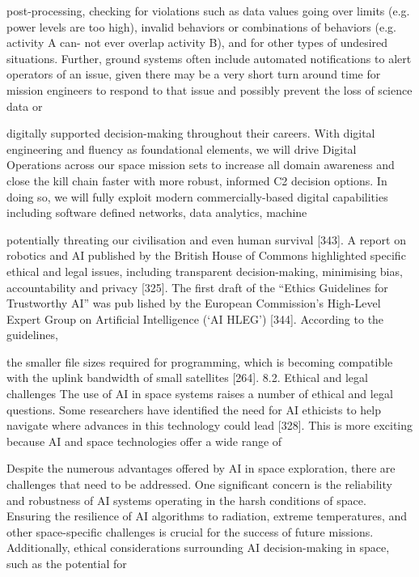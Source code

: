 \documentclass[a4paper,12pt]{article}
\begin{document}
post-processing, checking for violations such as data values
going over limits (e.g. power levels are too high), invalid
behaviors or combinations of behaviors (e.g. activity A can-
not ever overlap activity B), and for other types of undesired
situations. Further, ground systems often include automated
notiﬁcations to alert operators of an issue, given there may be
a very short turn around time for mission engineers to respond
to that issue and possibly prevent the loss of science data or

digitally supported decision-making throughout their 
careers.  
With digital engineering and fluency as foundational 
elements, we will drive Digital Operations across our 
space mission sets to increase all domain awareness and 
close the kill chain faster with more robust, informed C2 
decision options. In doing so, we will fully exploit modern 
commercially-based 
digital 
capabilities 
including 
software defined networks, data analytics, machine

potentially threating our civilisation and even human survival [343]. A 
report on robotics and AI published by the British House of Commons 
highlighted specific ethical and legal issues, including transparent 
decision-making, minimising bias, accountability and privacy [325]. 
The first draft of the “Ethics Guidelines for Trustworthy AI” was pub­
lished by the European Commission’s High-Level Expert Group on 
Artificial Intelligence (‘AI HLEG’) [344]. According to the guidelines,

the smaller file sizes required for programming, which is becoming 
compatible with the uplink bandwidth of small satellites [264]. 
8.2. Ethical and legal challenges 
The use of AI in space systems raises a number of ethical and legal 
questions. Some researchers have identified the need for AI ethicists to 
help navigate where advances in this technology could lead [328]. This 
is more exciting because AI and space technologies offer a wide range of

Despite the numerous advantages offered by AI in 
space exploration, there are challenges that need to 
be addressed. One significant concern is the 
reliability and robustness of AI systems operating in 
the harsh conditions of space. Ensuring the 
resilience of AI algorithms to radiation, extreme 
temperatures, and other space-specific challenges is 
crucial for the success of future missions. 
Additionally, ethical considerations surrounding AI 
decision-making in space, such as the potential for
\end{document}
